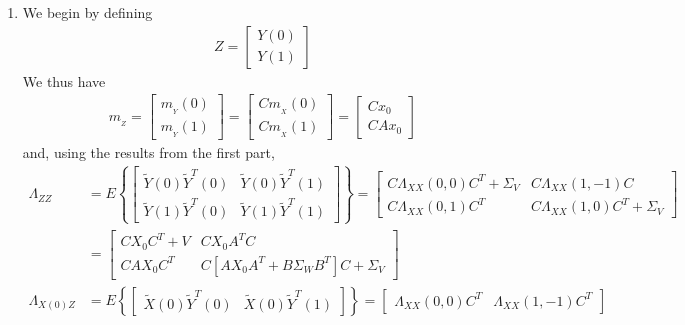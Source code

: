 \begin{enumerate}
\item
We begin by defining
\begin{align*}
    Z = \begin{bmatrix}
            Y(0) \\
            Y(1)
        \end{bmatrix}
\end{align*}
We thus have
\begin{align*}
    m_{_Z} = \begin{bmatrix}
            m_{_Y}(0) \\
            m_{_Y}(1)
        \end{bmatrix} = \begin{bmatrix}
            C m_{_X}(0) \\
            C m_{_X}(1)
        \end{bmatrix} = \begin{bmatrix}
            C x_0 \\
            CA x_0
        \end{bmatrix}
\end{align*}
and, using the results from the first part,
\begin{align*}
    \Lambda_{ZZ} & = E \left\{ \begin{bmatrix}
            \tilde{Y}(0) \tilde{Y}^T(0) & \tilde{Y}(0) \tilde{Y}^T(1) \\
            \tilde{Y}(1) \tilde{Y}^T(0) & \tilde{Y}(1) \tilde{Y}^T(1)
        \end{bmatrix} \right\} = \begin{bmatrix}
            C \Lambda_{XX}(0,0) C^T + \Sigma_V & C \Lambda_{XX}(1,-1) C \\
            C \Lambda_{XX}(0,1) C^T & C \Lambda_{XX}(1,0) C^T + \Sigma_V
        \end{bmatrix} \\
    & = \begin{bmatrix}
            C X_0 C^T + V & C X_0 A^T C \\
            C A X_0 C^T & C [AX_0 A^T + B \Sigma_W B^T] C + \Sigma_V
        \end{bmatrix} \\
    \Lambda_{X(0)Z} & = E \left\{ \begin{bmatrix}
            \tilde{X}(0) \tilde{Y}^T(0) & \tilde{X}(0) \tilde{Y}^T(1)
        \end{bmatrix} \right\} = \begin{bmatrix}
            \Lambda_{XX}(0,0) C^T & \Lambda_{XX}(1,-1) C^T
        \end{bmatrix} \\

\end{align*}
\end{enumerate}
